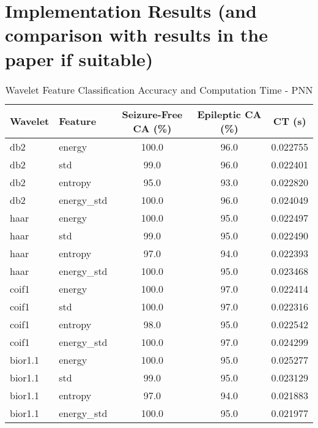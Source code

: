 \section{Implementation Results (and comparison with results in the paper if suitable)}

\begin{table}[ht]
    \centering
    \caption{Wavelet Feature Classification Accuracy and Computation Time - PNN}
    \begin{tabular}{l l S[table-format=3.1] S[table-format=3.1] S[table-format=1.6]}
        \toprule
        \textbf{Wavelet} & \textbf{Feature} & \textbf{Seizure-Free CA (\%)} & \textbf{Epileptic CA (\%)} & \textbf{CT (s)} \\
        \midrule
        db2       & energy       & 100.0 & 96.0 & 0.022755 \\
        db2       & std          & 99.0  & 96.0 & 0.022401 \\
        db2       & entropy      & 95.0  & 93.0 & 0.022820 \\
        db2       & energy\_std  &  100.0 &  96.0 &  0.024049 \\
        haar      & energy       & 100.0 & 95.0 & 0.022497 \\
        haar      & std          & 99.0  & 95.0 & 0.022490 \\
        haar      & entropy      & 97.0  & 94.0 & 0.022393 \\
        haar      & energy\_std  & 100.0 & 95.0 & 0.023468 \\
        coif1     & energy       &  100.0 & 97.0 &  0.022414 \\
        coif1     & std          &  100.0 &  97.0 &  0.022316 \\
        coif1     & entropy      & 98.0  & 95.0 & 0.022542 \\
        coif1     & energy\_std  & 100.0 & 97.0 & 0.024299 \\
        bior1.1   & energy       & 100.0 & 95.0 & 0.025277 \\
        bior1.1   & std          & 99.0  & 95.0 & 0.023129 \\
        bior1.1   & entropy      & 97.0  & 94.0 & 0.021883 \\
        bior1.1   & energy\_std  & 100.0 & 95.0 & 0.021977 \\
        \bottomrule
    \end{tabular}
\end{table}

